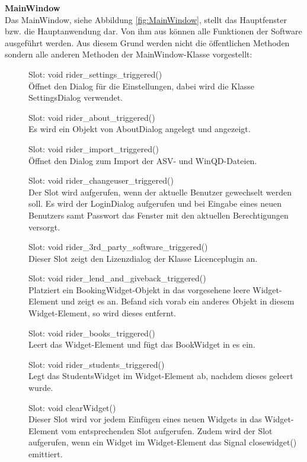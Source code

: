 \textbf{MainWindow}  \\
Das MainWindow, siehe Abbildung \ref{fig:MainWindow}, stellt das Hauptfenster bzw. die Hauptanwendung dar. Von ihm aus können alle Funktionen der Software ausgeführt werden. Aus diesem Grund werden nicht die öffentlichen Methoden sondern alle anderen Methoden der MainWindow-Klasse vorgestellt:
\begin{description}
	\item[ ] Slot: void rider\_settings\_triggered()\\
	Öffnet den Dialog für die Einstellungen, dabei wird die Klasse SettingsDialog verwendet.
  \item[ ] Slot: void rider\_about\_triggered()\\
	Es wird ein Objekt von AboutDialog angelegt und angezeigt.
  \item[ ] Slot: void rider\_import\_triggered()\\
	Öffnet den Dialog zum Import der ASV- und WinQD-Dateien.
  \item[ ] Slot: void rider\_changeuser\_triggered()\\
	Der Slot wird aufgerufen, wenn der aktuelle Benutzer gewechselt werden soll. Es wird der LoginDialog aufgerufen und bei Eingabe eines neuen Benutzers samt Passwort das Fenster mit den aktuellen Berechtigungen versorgt.
  \item[ ] Slot: void rider\_3rd\_party\_software\_triggered()\\
	Dieser Slot zeigt den Lizenzdialog der Klasse Licenceplugin an.
  \item[ ] Slot: void rider\_lend\_and\_giveback\_triggered()\\
	Platziert ein BookingWidget-Objekt in das vorgesehene leere Widget-Element und zeigt es an. Befand sich vorab ein anderes Objekt in diesem Widget-Element, so wird dieses entfernt.
  \item[ ] Slot: void rider\_books\_triggered()\\
	Leert das Widget-Element und fügt das BookWidget in es ein.
  \item[ ] Slot: void rider\_students\_triggered()\\
	Legt das StudentsWidget im Widget-Element ab, nachdem dieses geleert wurde.
  \item[ ] Slot: void clearWidget()\\
	Dieser Slot wird vor jedem Einfügen eines neuen Widgets in das Widget-Element vom entsprechenden Slot aufgerufen. Zudem wird der Slot aufgerufen, wenn ein Widget im Widget-Element das Signal closewidget() emittiert. 

\end{description}
